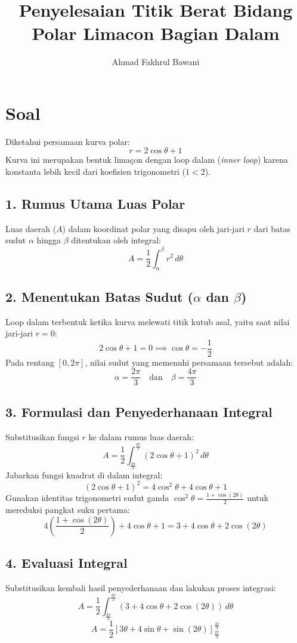 \documentclass[12pt,a4paper]{article}
\title{Penyelesaian Titik Berat Bidang Polar Limacon Bagian Dalam}
\author{Ahmad Fakhrul Bawani}
\date{}
\begin{document}
\maketitle

\section*{Soal}

Diketahui persamaan kurva polar:
\[
r = 2\cos\theta + 1
\]
Kurva ini merupakan bentuk lima\c{c}on dengan loop dalam (\textit{inner loop}) karena konstanta lebih kecil dari koefisien trigonometri ($1 < 2$).

\subsection*{1. Rumus Utama Luas Polar}
Luas daerah ($A$) dalam koordinat polar yang disapu oleh jari-jari $r$ dari batas sudut $\alpha$ hingga $\beta$ ditentukan oleh integral:
\[
A = \frac{1}{2} \int_{\alpha}^{\beta} r^2 \, d\theta
\]

\subsection*{2. Menentukan Batas Sudut ($\alpha$ dan $\beta$)}
Loop dalam terbentuk ketika kurva melewati titik kutub asal, yaitu saat nilai jari-jari $r = 0$:
\[
2\cos\theta + 1 = 0 \implies \cos\theta = -\frac{1}{2}
\]
Pada rentang $[0, 2\pi]$, nilai sudut yang memenuhi persamaan tersebut adalah:
\[
\alpha = \frac{2\pi}{3} \quad \text{dan} \quad \beta = \frac{4\pi}{3}
\]

\subsection*{3. Formulasi dan Penyederhanaan Integral}
Substitusikan fungsi $r$ ke dalam rumus luas daerah:
\[
A = \frac{1}{2} \int_{\frac{2\pi}{3}}^{\frac{4\pi}{3}} (2\cos\theta + 1)^2 \, d\theta
\]
Jabarkan fungsi kuadrat di dalam integral:
\[
(2\cos\theta + 1)^2 = 4\cos^2\theta + 4\cos\theta + 1
\]
Gunakan identitas trigonometri sudut ganda $\cos^2\theta = \frac{1 + \cos(2\theta)}{2}$ untuk mereduksi pangkat suku pertama:
\[
4\left(\frac{1 + \cos(2\theta)}{2}\right) + 4\cos\theta + 1 = 3 + 4\cos\theta + 2\cos(2\theta)
\]

\subsection*{4. Evaluasi Integral}
Substitusikan kembali hasil penyederhanaan dan lakukan proses integrasi:
\[
A = \frac{1}{2} \int_{\frac{2\pi}{3}}^{\frac{4\pi}{3}} \left( 3 + 4\cos\theta + 2\cos(2\theta) \right) \, d\theta
\]
\[
A = \frac{1}{2} \left[ 3\theta + 4\sin\theta + \sin(2\theta) \right]_{\frac{2\pi}{3}}^{\frac{4\pi}{3}}
\]
\end{document}

